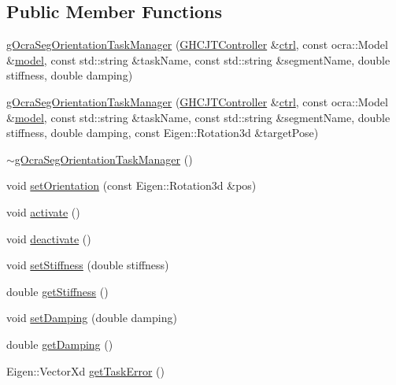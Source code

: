 \subsection*{Public Member Functions}
\begin{DoxyCompactItemize}
\item 
\hyperlink{classgocra_1_1gOcraSegOrientationTaskManager_a4d14922b755ae527247c7c82b1c99cdb}{g\+Ocra\+Seg\+Orientation\+Task\+Manager} (\hyperlink{classgocra_1_1GHCJTController}{G\+H\+C\+J\+T\+Controller} \&\hyperlink{classgocra_1_1gOcraTaskManagerBase_a52d76d9b54d92f3d31faeaafda99e4c7}{ctrl}, const ocra\+::\+Model \&\hyperlink{classgocra_1_1gOcraTaskManagerBase_adc439e7170f7120611fc6d009d06404e}{model}, const std\+::string \&task\+Name, const std\+::string \&segment\+Name, double stiffness, double damping)
\item 
\hyperlink{classgocra_1_1gOcraSegOrientationTaskManager_abdf3dc20892fc1308806b72b9976461e}{g\+Ocra\+Seg\+Orientation\+Task\+Manager} (\hyperlink{classgocra_1_1GHCJTController}{G\+H\+C\+J\+T\+Controller} \&\hyperlink{classgocra_1_1gOcraTaskManagerBase_a52d76d9b54d92f3d31faeaafda99e4c7}{ctrl}, const ocra\+::\+Model \&\hyperlink{classgocra_1_1gOcraTaskManagerBase_adc439e7170f7120611fc6d009d06404e}{model}, const std\+::string \&task\+Name, const std\+::string \&segment\+Name, double stiffness, double damping, const Eigen\+::\+Rotation3d \&target\+Pose)
\item 
\hyperlink{classgocra_1_1gOcraSegOrientationTaskManager_a24289f538bb64660dc9e294fcab261ae}{$\sim$g\+Ocra\+Seg\+Orientation\+Task\+Manager} ()
\item 
void \hyperlink{classgocra_1_1gOcraSegOrientationTaskManager_a3e0d8d41f14d2368777b5b84e0ef5d4f}{set\+Orientation} (const Eigen\+::\+Rotation3d \&pos)
\item 
void \hyperlink{classgocra_1_1gOcraSegOrientationTaskManager_aafe5bc35406c5d99288d05d6468e041f}{activate} ()
\item 
void \hyperlink{classgocra_1_1gOcraSegOrientationTaskManager_a5ebf0c1a5813c6a2895965d973f77539}{deactivate} ()
\item 
void \hyperlink{classgocra_1_1gOcraSegOrientationTaskManager_abca07f3d06e8731757a9946b5255a20c}{set\+Stiffness} (double stiffness)
\item 
double \hyperlink{classgocra_1_1gOcraSegOrientationTaskManager_a4003635cf40005d447614d2759280145}{get\+Stiffness} ()
\item 
void \hyperlink{classgocra_1_1gOcraSegOrientationTaskManager_acca4be597440e5da0e3ded3d78116c18}{set\+Damping} (double damping)
\item 
double \hyperlink{classgocra_1_1gOcraSegOrientationTaskManager_aa702c1703f667054e3d84e9a6791d15f}{get\+Damping} ()
\item 
Eigen\+::\+Vector\+Xd \hyperlink{classgocra_1_1gOcraSegOrientationTaskManager_a37aa69c90bd5d3d0318de77aa56cd4dd}{get\+Task\+Error} ()
\end{DoxyCompactItemize}
